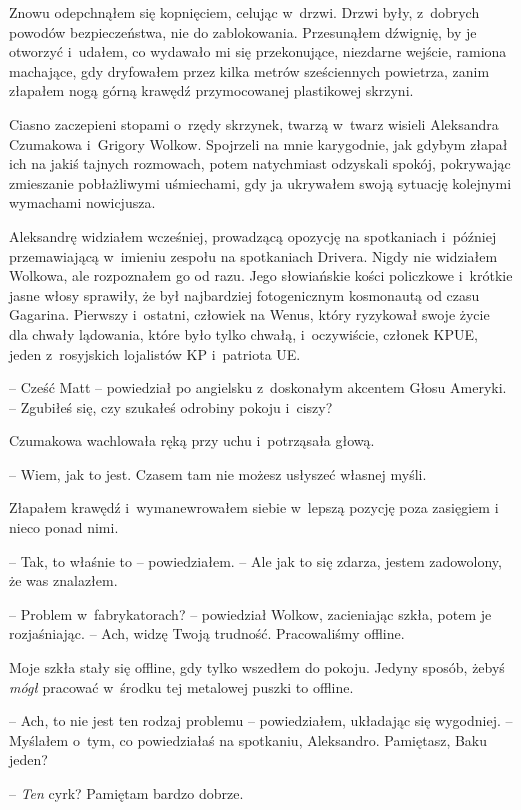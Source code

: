 \documentclass[oneside,polish,12pt,sfheadings]{mwbk}
\begin{document}
Znowu odepchnąłem się kopnięciem, celując w~drzwi. Drzwi były, z~dobrych
powodów bezpieczeństwa, nie do zablokowania. Przesunąłem dźwignię, by je
otworzyć i~udałem, co wydawało mi się przekonujące, niezdarne wejście,
ramiona machające, gdy dryfowałem przez kilka metrów sześciennych
powietrza, zanim złapałem nogą górną krawędź przymocowanej plastikowej
skrzyni.

Ciasno zaczepieni stopami o~rzędy skrzynek, twarzą w~twarz wisieli
Aleksandra Czumakowa i~Grigory Wolkow. Spojrzeli na mnie karygodnie, jak
gdybym złapał ich na jakiś tajnych rozmowach, potem natychmiast
odzyskali spokój, pokrywając zmieszanie pobłażliwymi uśmiechami, gdy ja
ukrywałem swoją sytuację kolejnymi wymachami nowicjusza.

Aleksandrę widziałem wcześniej, prowadzącą opozycję na spotkaniach i~później przemawiającą w~imieniu zespołu na spotkaniach Drivera. Nigdy
nie widziałem Wolkowa, ale rozpoznałem go od razu. Jego słowiańskie
kości policzkowe i~krótkie jasne włosy sprawiły, że był najbardziej
fotogenicznym kosmonautą od czasu Gagarina. Pierwszy i~ostatni,
człowiek na Wenus, który ryzykował swoje życie dla chwały lądowania,
które było tylko chwałą, i~oczywiście, członek KPUE, jeden z~rosyjskich
lojalistów KP i~patriota UE.

-- Cześć Matt -- powiedział po angielsku z~doskonałym akcentem Głosu
Ameryki. -- Zgubiłeś się, czy szukałeś odrobiny pokoju i~ciszy?

Czumakowa wachlowała ręką przy uchu i~potrząsała głową. 

-- Wiem, jak to
jest. Czasem tam nie możesz usłyszeć własnej myśli.

Złapałem krawędź i~wymanewrowałem siebie w~lepszą pozycję poza zasięgiem
i nieco ponad nimi.

-- Tak, to właśnie to -- powiedziałem. -- Ale jak to się zdarza, jestem
zadowolony, że was znalazłem.

-- Problem w~fabrykatorach? -- powiedział Wolkow, zacieniając szkła, potem
je rozjaśniając. -- Ach, widzę Twoją trudność. Pracowaliśmy offline.

Moje szkła stały się offline, gdy tylko wszedłem do pokoju. Jedyny
sposób, żebyś \emph{mógł} pracować w~środku tej metalowej puszki to
offline.

-- Ach, to nie jest ten rodzaj problemu -- powiedziałem, układając się
wygodniej. -- Myślałem o~tym, co powiedziałaś na spotkaniu, Aleksandro.
Pamiętasz, Baku jeden?

-- \emph{Ten} cyrk? Pamiętam bardzo dobrze.
\end{document}
